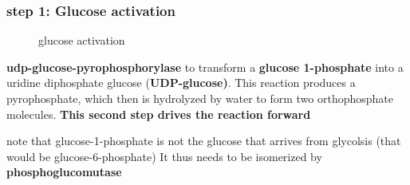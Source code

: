 \documentclass[../main.tex]{subfiles}
\begin{document}
\subsubsection{step 1: Glucose activation}
\begin{figure}[H]
	\centering
	\caption{glucose activation}
\end{figure}
\textbf{\gls{udp-glucose-pyrophosphorylase}} to transform a 
\textbf{glucose 1-phosphate} into a uridine diphosphate glucose (\textbf{UDP-glucose)}. This reaction produces a 
pyrophosphate, which then is hydrolyzed by water to form two orthophosphate 
molecules.\textbf{ This second step drives the reaction forward}

\begin{remark}
    note that glucose-1-phosphate is not the glucose that arrives from glycolsis (that would be glucose-6-phosphate) It thus needs to be isomerized by \textbf{\gls{phosphoglucomutase}}
\end{remark}
\end{document}
